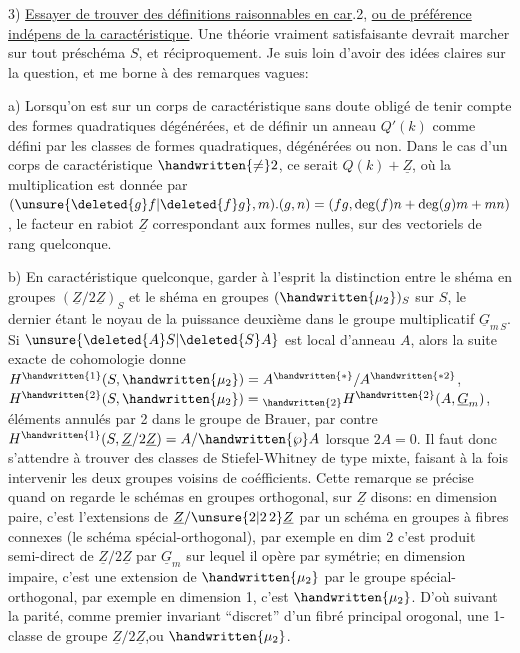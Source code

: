 3) \uline{Essayer de trouver des définitions raisonnables en car}.2, \uline{ou de préférence indépens de la caractéristique}. Une théorie vraiment satisfaisante devrait marcher sur tout préschéma $S$, et réciproquement. Je suis loin d'avoir des idées claires sur la question, et me borne à des remarques vagues:

a) Lorsqu'on est sur un corps de caractéristique   sans doute obligé de tenir compte des formes quadratiques dégénérées, et de définir un anneau $Q'(k)$ comme défini par les classes de formes quadratiques, dégénérées ou non. \handwritten{[}Dans le cas d'un corps de  caractéristique $\handwritten{\ne}2$, ce serait $Q(k)+\underline{Z}$, où la  multiplication est donnée par $(\unsure{\deleted{g}f|\deleted{f}g},m).(g,n)=(fg,\deg(f)n+\deg(g)m+mn)$, le facteur en rabiot $\underline{Z}$ correspondant aux formes nulles, sur des vectoriels de rang quelconque\handwritten{]}.

b) En caractéristique quelconque, garder à l'esprit la distinction entre le shéma en groupes $(\underline{Z}/2\underline{Z})_S$ et le shéma en groupes $(\handwritten{\mu_2})_S$ sur $S$, le dernier étant le noyau de la puissance deuxième dans le groupe multiplicatif $\underline{G}_{m\,S}$. Si $\unsure{\deleted{A}S|\deleted{S}A}$ est local d'anneau $A$, alors la suite exacte de cohomologie donne $H^{\handwritten{1}}(S,\handwritten{\mu_2})=A^{\handwritten{*}}/A^{\handwritten{*2}}$, $H^{\handwritten{2}}(S,\handwritten{\mu_2})={}_{\handwritten{2}}H^{\handwritten{2}}(A,\underline{G}_m)$, éléments annulés par 2 dans le groupe de Brauer, par contre $H^{\handwritten{1}}(S,\underline{Z}/2\underline{Z})=A/\handwritten{\wp}A$ lorsque $2A=0$. Il faut donc s'attendre à trouver des classes de Stiefel-Whitney de type mixte, faisant à la fois intervenir les deux groupes voisins de coéfficients. Cette remarque se précise quand on regarde le schémas en groupes orthogonal, sur $\underline{Z}$ disons: en dimension paire, c'est l'extensions de $\underline{Z}/\unsure{2|2\,2}\underline{Z}$ par un schéma en groupes à fibres connexes (le schéma spécial-orthogonal), par exemple en dim 2 c'est   produit semi-direct de $\underline{Z}/2\underline{Z}$ par $\underline{G}_m$ sur lequel il opère par symétrie; en dimension impaire, c'est une extension de $\handwritten{\mu_2}$ par le groupe spécial-orthogonal, par exemple en dimension 1, c'est $\handwritten{\mu_2}$. D'où suivant la parité, comme premier invariant ``discret'' d'un fibré principal orogonal, une 1-classe de groupe $\underline{Z}/2\underline{Z}$,ou $\handwritten{\mu_2}$.
